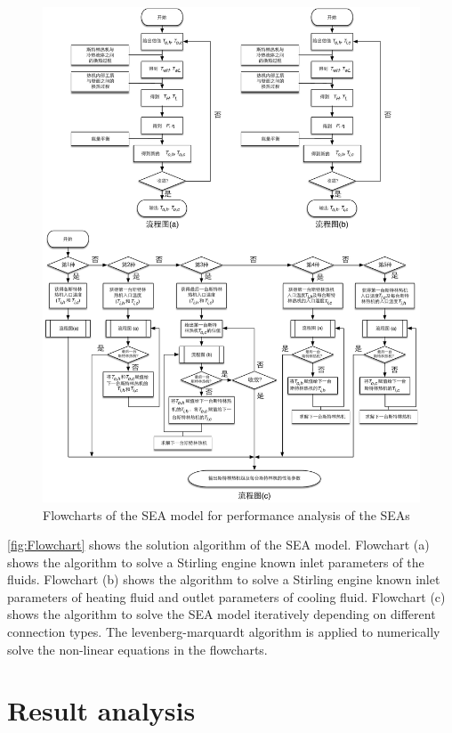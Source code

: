 \begin{figure}[htbp]
\centering
	\includegraphics[width = 1.0\columnwidth]{fig/FlowChart}
	\caption{Flowcharts of the SEA model for performance analysis of the SEAs}
	\label{fig:Flowchart}

\end{figure}

\autoref{fig:Flowchart} shows the solution algorithm of the SEA model. Flowchart (a) shows the algorithm to solve a Stirling engine known inlet parameters of the fluids. Flowchart (b) shows the algorithm to solve a Stirling engine known inlet parameters of heating fluid and outlet parameters of cooling fluid. Flowchart (c) shows the algorithm to solve the SEA model iteratively depending on different connection types. The levenberg-marquardt algorithm is applied to numerically solve the non-linear equations in the flowcharts.

\section{Result analysis}

